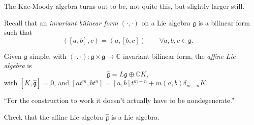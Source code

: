 The Kac-Moody algebra turns out to be, not quite this, but slightly larger
still.

Recall that an {\it invariant bilinear form} $(\cdot,\cdot)$ on a Lie algebra
$\mathfrak{g}$ is a bilinear form such that
\begin{equation}
\label{equation-invariant-bilinear-form}
([a,b],c)=(a,[b,c])\qquad \forall a,b,c \in \mathfrak{g}.
\end{equation}

\begin{definition}
\label{definition-affine-Lie-algebra}
Given $\mathfrak{g}$ simple, with 
$(\cdot,\cdot):\mathfrak{g} \times \mathfrak{g} \to \mathbb{C}$ 
invariant bilinear form, the {\it affine Lie algebra} is 
$$
\hat{\mathfrak{g}}=L\mathfrak{g} \oplus \mathbb{C}K,
$$
with $[K,\hat{\mathfrak{g}}]=0$, and 
$[at^m,bt^n]=[a,b]t^{m+n}+m(a,b)\delta_{m,-n}K$.
\end{definition}

``For the construction to work it doesn't actually have to be nondegenerate.''

\begin{exercise}
\label{exercise-affine-Lie-algebra-is-Lie-algebra}
Check that the affine Lie algebra $\hat{\mathfrak{g}}$ is a Lie algebra.
\end{exercise}

